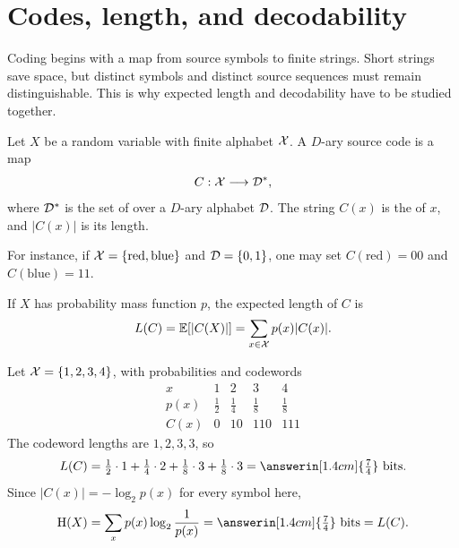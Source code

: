 \section{Codes, length, and decodability}\label{sec:codes}
\quad{}

\begin{strand}
Coding begins with a map from source symbols to finite strings. Short strings
save space, but distinct symbols and distinct source sequences must remain
distinguishable. This is why expected length and decodability have to be studied
together.
\end{strand}


\begin{definition}\label{def:source-code}
Let $X$ be a random variable with finite alphabet $\mathcal{X}$. A $D$-ary source code is
a map
\[
  C:\mathcal{X}\longrightarrow\mathcal{D}^*,
\]
where $\mathcal{D}^*$ is the set of  over a
$D$-ary alphabet $\mathcal{D}$. The string $C(x)$ is the  of $x$, and
$|C(x)|$ is its length.
\end{definition}

For instance, if $\mathcal{X}=\{\text{red},\text{blue}\}$ and $\mathcal{D}=\{0,1\}$, one may set
$C(\text{red})=00$ and $C(\text{blue})=11$.

\begin{definition}\label{def:expected-length}
If $X$ has probability mass function $p$, the expected length of $C$ is
\[
  L(C)=\mathbb{E}[|C(X)|]
      =\sum_{x\in\mathcal{X}}p(x)|C(x)|.
\]
\end{definition}

\begin{example}\label{ex:dyadic-code}
Let $\mathcal{X}=\{1,2,3,4\}$, with probabilities and codewords
\[
\begin{array}{c|cccc}
x&1&2&3&4\\ \hline
p(x)&\tfrac12&\tfrac14&\tfrac18&\tfrac18\\
C(x)&0&10&110&111
\end{array}
\]
The codeword lengths are $1,2,3,3$, so
\[
  L(C)=\tfrac12\cdot1+\tfrac14\cdot2
       +\tfrac18\cdot3+\tfrac18\cdot3
       =\answerin[1.4cm]{\tfrac74}\ \text{bits}.
\]
Since $|C(x)|=-\log_2 p(x)$ for every symbol here,
\[
  \Ent(X)=\sum_xp(x)\log_2\frac1{p(x)}
         =\answerin[1.4cm]{\tfrac74}\ \text{bits}=L(C).
\]
\end{example}


